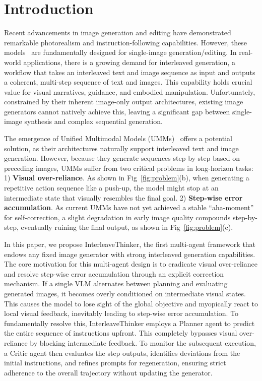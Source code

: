 \documentclass{article} %
\begin{document}
\section{Introduction}
Recent advancements in image generation and editing have demonstrated remarkable photorealism and instruction-following capabilities. However, these models~\cite{flux2024,flux2,qwenimage,longcatimage,sd3,wang2025ovis} are fundamentally designed for single-image generation/editing. In real-world applications, there is a growing demand for interleaved generation, a workflow that takes an interleaved text and image sequence as input and outputs a coherent, multi-step sequence of text and images. This capability holds crucial value for visual narratives, guidance, and embodied manipulation. Unfortunately, constrained by their inherent image-only output architectures, existing image generators cannot natively achieve this, leaving a significant gap between single-image synthesis and complex sequential generation.

The emergence of Unified Multimodal Models (UMMs)~\cite{januspro,cui2025emu3_5,nanobanana,bagel,wu2025omnigen2,cao2025hunyuanimage,aia} offers a potential solution, as their architectures naturally support interleaved text and image generation. However, because they generate sequences step-by-step based on preceding images, UMMs suffer from two critical problems in long-horizon tasks: 1) \textbf{Visual over-reliance}. As shown in Fig~\ref{fig:problem}(b), when generating a repetitive action sequence like a push-up, the model might stop at an intermediate state that visually resembles the final goal. 2) \textbf{Step-wise error accumulation}. As current UMMs have not yet achieved a stable ``aha-moment'' for self-correction, a slight degradation in early image quality compounds step-by-step, eventually ruining the final output, as shown in Fig~\ref{fig:problem}(c).

In this paper, we propose InterleaveThinker, the first multi-agent framework that endows any fixed image generator with strong interleaved generation capabilities. The core motivation for this multi-agent design is to eradicate visual over-reliance and resolve step-wise error accumulation through an explicit correction mechanism. If a single VLM alternates between planning and evaluating generated images, it becomes overly conditioned on intermediate visual states. This causes the model to lose sight of the global objective and myopically react to local visual feedback, inevitably leading to step-wise error accumulation. To fundamentally resolve this, InterleaveThinker employs a Planner agent to predict the entire sequence of instructions upfront. This completely bypasses visual over-reliance by blocking intermediate feedback. To monitor the subsequent execution, a Critic agent then evaluates the step outputs, identifies deviations from the initial instructions, and refines prompts for regeneration, ensuring strict adherence to the overall trajectory without updating the generator.
\end{document}
